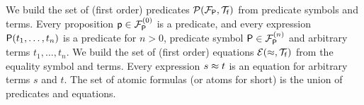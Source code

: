 
\begin{definition}\label{def:predicates}\label{def:equations}\label{def:atoms}
	We build the set of (first order) {\myem predicates} $\mcPT$
	from predicate symbols and terms. 
	Every proposition $\mpp\in \mcFPn[0]$ is a predicate, 
	and every expression $\mP(t_1,\ldots,t_n)$ is a predicate for $n>0$,
	predicate symbol $\mP\in\mcFPn$ and arbitrary terms $t_1,\ldots,t_n$.
%	
	We build the set of (first order) {\myem equations }$\mcET$ from the equality symbol and terms.
	Every expression $s\mEQ t$ is an equation%
	for arbitrary terms $s$ and $t$.
%	
	The set of atomic formulas (or {\myem atoms }for short) is the union of predicates and equations.
\end{definition}
